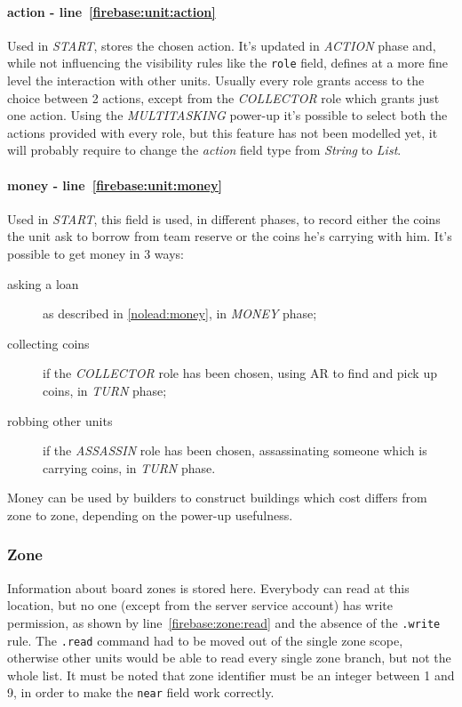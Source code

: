 				\paragraph{action - line~\ref{firebase:unit:action}}
				Used in \emph{START}, stores the chosen action. It's updated in \emph{ACTION} phase and, while not influencing the visibility rules like the \lstinline|role| field, defines at a more fine level the interaction with other units. Usually every role grants access to the choice between 2 actions, except from the \emph{COLLECTOR} role which grants just one action. Using the \emph{MULTITASKING} power-up it's possible to select both the actions provided with every role, but this feature has not been modelled yet, it will probably require to change the \emph{action} field type from \emph{String} to \emph{List}.
				
				\paragraph{money - line~\ref{firebase:unit:money}}
				Used in \emph{START}, this field is used, in different phases, to record either the coins the unit ask to borrow from team reserve or the coins he's carrying with him. It's possible to get money in 3 ways:
				\begin{description}
					\item[asking a loan] as described in \autoref{nolead:money}, in \emph{MONEY} phase;
					\item[collecting coins] if the \emph{COLLECTOR} role has been chosen, using AR to find and pick up coins, in \emph{TURN} phase;
					\item[robbing other units] if the \emph{ASSASSIN} role has been chosen, assassinating someone which is carrying coins, in \emph{TURN} phase.
				\end{description}
			
				Money can be used by builders to construct buildings which cost differs from zone to zone, depending on the power-up usefulness.
			
			\subsubsection{Zone}
			
				
								
				Information about board zones is stored here.
				Everybody can read at this location, but no one (except from the server service account) has write permission, as shown by line~\ref{firebase:zone:read} and the absence of the \lstinline|.write| rule.
				The \lstinline|.read| command had to be moved out of the single zone scope, otherwise other units would be able to read every single zone branch, but not the whole list.
				It must be noted that zone identifier must be an integer between 1 and 9, in order to make the \lstinline|near| field work correctly. \\
				
